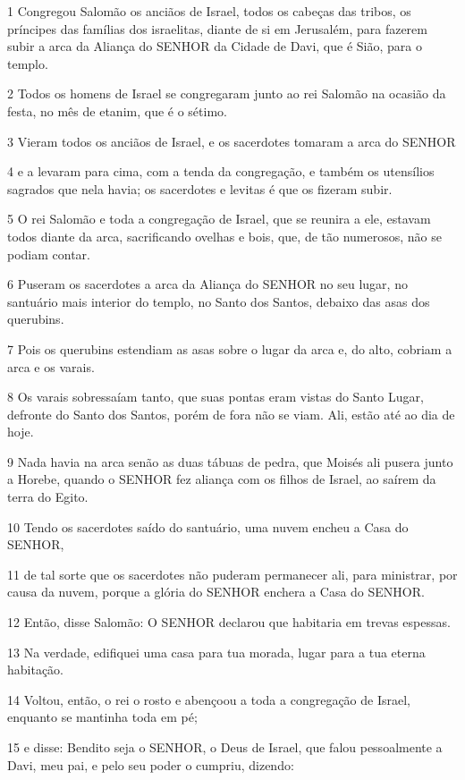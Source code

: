 \par 1 Congregou Salomão os anciãos de Israel, todos os cabeças das tribos, os príncipes das famílias dos israelitas, diante de si em Jerusalém, para fazerem subir a arca da Aliança do SENHOR da Cidade de Davi, que é Sião, para o templo.
\par 2 Todos os homens de Israel se congregaram junto ao rei Salomão na ocasião da festa, no mês de etanim, que é o sétimo.
\par 3 Vieram todos os anciãos de Israel, e os sacerdotes tomaram a arca do SENHOR
\par 4 e a levaram para cima, com a tenda da congregação, e também os utensílios sagrados que nela havia; os sacerdotes e levitas é que os fizeram subir.
\par 5 O rei Salomão e toda a congregação de Israel, que se reunira a ele, estavam todos diante da arca, sacrificando ovelhas e bois, que, de tão numerosos, não se podiam contar.
\par 6 Puseram os sacerdotes a arca da Aliança do SENHOR no seu lugar, no santuário mais interior do templo, no Santo dos Santos, debaixo das asas dos querubins.
\par 7 Pois os querubins estendiam as asas sobre o lugar da arca e, do alto, cobriam a arca e os varais.
\par 8 Os varais sobressaíam tanto, que suas pontas eram vistas do Santo Lugar, defronte do Santo dos Santos, porém de fora não se viam. Ali, estão até ao dia de hoje.
\par 9 Nada havia na arca senão as duas tábuas de pedra, que Moisés ali pusera junto a Horebe, quando o SENHOR fez aliança com os filhos de Israel, ao saírem da terra do Egito.
\par 10 Tendo os sacerdotes saído do santuário, uma nuvem encheu a Casa do SENHOR,
\par 11 de tal sorte que os sacerdotes não puderam permanecer ali, para ministrar, por causa da nuvem, porque a glória do SENHOR enchera a Casa do SENHOR.
\par 12 Então, disse Salomão: O SENHOR declarou que habitaria em trevas espessas.
\par 13 Na verdade, edifiquei uma casa para tua morada, lugar para a tua eterna habitação.
\par 14 Voltou, então, o rei o rosto e abençoou a toda a congregação de Israel, enquanto se mantinha toda em pé;
\par 15 e disse: Bendito seja o SENHOR, o Deus de Israel, que falou pessoalmente a Davi, meu pai, e pelo seu poder o cumpriu, dizendo:
